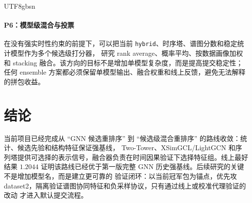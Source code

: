 \documentclass[letterpaper,11pt,leqno]{article}
\newcommand{\bib}{paper}
\newcommand{\code}[1]{\texttt{#1}}
\begin{document}
\begin{CJK*}{UTF8}{gbsn}
\paragraph{P6：模型级混合与投票}
在没有强实时性约束的前提下，可以把当前 \code{hybrid}、时序塔、谱图分数和稳定统计模型作为多个候选级打分器，
研究 rank average、概率平均、按数据画像加权和 stacking 融合。该方向的目标不是增加单模型复杂度，而是提高提交稳定性；
任何 ensemble 方案都必须保留单模型输出、融合权重和线上反馈，避免无法解释的拼包收益。

\section{结论}

当前项目已经完成从 ``GNN 候选重排序'' 到 ``候选级混合重排序'' 的路线收敛：统计、候选先验和结构特征保证强基线，
Two-Tower、XSimGCL/LightGCN 和序列塔提供可选择的表示信号，融合器负责在时间因果验证下选择特征组。线上最好结果
$1.2044$ 证明该路线已经优于第一版完整 GNN 历史强基线。后续研究的关键不是增加模型名，而是建立更可靠的
验证闭环：以当前冠军包为锚点，优先攻 dataset2，隔离验证谱图协同特征和负采样协议，只有通过线上或校准代理验证的改动
才进入默认提交流程。



\end{CJK*}
\end{document}
